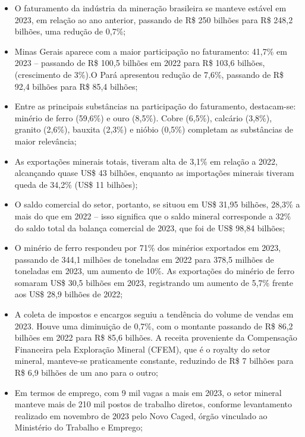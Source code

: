 \begin{itemize}
\item O faturamento da indústria da mineração brasileira se manteve estável em 2023, em relação ao ano anterior, passando de R\$ 250 bilhões para R\$ 248,2 bilhões, uma redução de 0,7\%;

\item Minas Gerais aparece com a maior participação no faturamento: 41,7\% em 2023 -- passando de R\$ 100,5 bilhões em 2022 para R\$ 103,6 bilhões, (crescimento de 3\%).O Pará apresentou redução de 7,6\%, passando de R\$ 92,4 bilhões para R\$ 85,4 bilhões;

\item Entre as principais substâncias na participação do faturamento, destacam-se: minério de ferro (59,6\%) e ouro (8,5\%). Cobre (6,5\%), calcário (3,8\%), granito (2,6\%), bauxita (2,3\%) e nióbio (0,5\%) completam as substâncias de maior relevância;

\item As exportações minerais totais, tiveram alta de 3,1\% em relação a 2022, alcançando quase US\$ 43 bilhões, enquanto as importações minerais tiveram queda de 34,2\% (US\$ 11 bilhões);

\item O saldo comercial do setor, portanto, se situou em US\$ 31,95 bilhões, 28,3\% a mais do que em 2022 -- isso significa que o saldo mineral corresponde a 32\% do saldo total da balança comercial de 2023, que foi de US\$ 98,84 bilhões;

\item O minério de ferro respondeu por 71\% dos minérios exportados em 2023, passando de 344,1 milhões de toneladas em 2022 para 378,5 milhões de toneladas em 2023, um aumento de 10\%. As exportações do minério de ferro somaram US\$ 30,5 bilhões em 2023, registrando um aumento de 5,7\% frente aos US\$ 28,9 bilhões de 2022;

\item A coleta de impostos e encargos seguiu a tendência do volume de vendas em 2023. Houve uma diminuição de 0,7\%, com o montante passando de R\$ 86,2 bilhões em 2022 para R\$ 85,6 bilhões. A receita proveniente da Compensação Financeira pela Exploração Mineral (CFEM), que é o royalty do setor mineral, manteve-se
    praticamente constante, reduzindo de R\$ 7 bilhões para R\$ 6,9 bilhões de um ano para o outro;

\item Em termos de emprego, com 9 mil vagas a mais em 2023, o setor mineral manteve mais de 210 mil postos de trabalho diretos, conforme levantamento realizado em novembro de 2023 pelo Novo Caged, órgão vinculado ao Ministério do Trabalho e Emprego;


\end{itemize}
